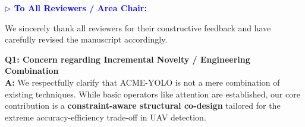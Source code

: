 \documentclass[10pt,twocolumn,letterpaper]{article}
\begin{document}
\begin{table}[t]
  \vspace{0.05cm}
  
  \vspace{-0.2cm}
\end{table}


\vspace{-5.5em}

\noindent\textcolor{blue}{\textbf{$\triangleright$ To All Reviewers / Area Chair:}}

\noindent We sincerely thank all reviewers for their constructive feedback and have carefully revised the manuscript accordingly.

\noindent\textbf{Q1: Concern regarding Incremental Novelty / Engineering Combination} \\

\noindent\textbf{A:} We respectfully clarify that ACME-YOLO is not a mere combination of existing techniques. While basic operators like attention are established, our core contribution is a \textbf{constraint-aware structural co-design} tailored for the extreme accuracy-efficiency trade-off in UAV detection. 
\end{document}
